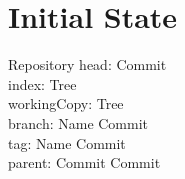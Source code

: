 \section{Initial State}

\begin{schema}{Repository}
	head: Commit \\
	index: Tree \\
	workingCopy: Tree \\
	branch: Name \pfun Commit \\
	tag: Name \pfun Commit \\
	parent: Commit \pfun \power Commit
\end{schema}

